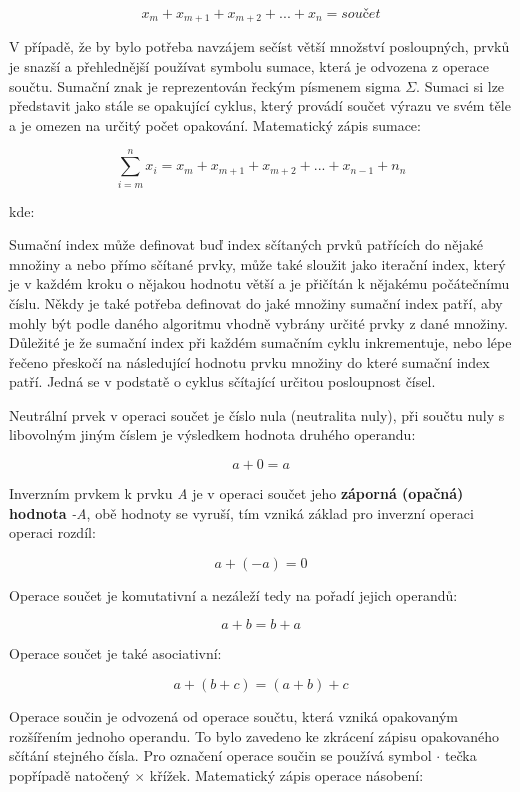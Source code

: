$$ x_m + x_{m+1} + x_{m+2} + ... + x_n = součet $$

V případě, že by bylo potřeba navzájem sečíst větší množství posloupných, prvků je snazší a přehlednější používat symbolu sumace, která je odvozena z operace součtu. Sumační znak je reprezentován řeckým písmenem sigma $\Sigma$. Sumaci si lze představit jako stále se opakující cyklus, který provádí součet výrazu ve svém těle a je omezen na určitý počet opakování. Matematický zápis sumace:

$$\sum^n_{i=m} x_i = x_m + x_{m+1} + x_{m+2}+...+x_{n-1}+n_n $$

kde:

\vskip 4mm
\vskip 4mm

Sumační index může definovat buď index sčítaných prvků patřících do nějaké množiny a nebo přímo sčítané prvky, může také sloužit jako iterační index, který je v každém kroku o nějakou hodnotu větší a je přičítán k nějakému počátečnímu číslu. Někdy je také potřeba definovat do jaké množiny sumační index patří, aby mohly být podle daného algoritmu vhodně vybrány určité prvky z dané množiny. Důležité je že sumační index při každém sumačním cyklu inkrementuje, nebo lépe řečeno přeskočí na následující hodnotu prvku množiny do které sumační index patří. Jedná se v podstatě o cyklus sčítající určitou posloupnost čísel.


Neutrální prvek v operaci součet je číslo nula (neutralita nuly), při součtu nuly s libovolným jiným číslem je výsledkem hodnota druhého operandu:

$$ a + 0 = a $$

Inverzním prvkem k prvku {\it A} je v operaci součet jeho {\bf záporná (opač\-ná) hodnota} {\it -A}, obě hodnoty se vyruší, tím vzniká základ pro inverzní operaci operaci rozdíl:

$$ a + (-a) = 0 $$

Operace součet je komutativní a nezáleží tedy na pořadí jejich operandů:

$$ a+b = b+a $$

Operace součet je také asociativní:

$$ a+(b+c) = (a+b)+c $$


Operace součin je odvozená od operace součtu, která vzniká opakovaným rozšířením jednoho operandu. To bylo zavedeno ke zkrácení zápisu opakovaného sčítání stejného čísla. Pro označení operace součin se používá symbol $\cdot$ tečka popřípadě natočený $\times$ křížek. Matematický zápis operace násobení:

